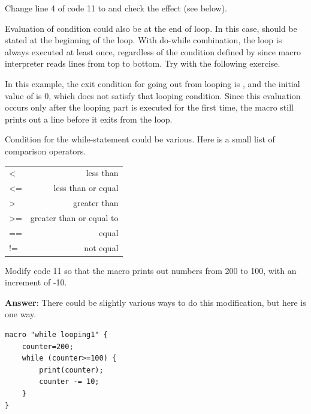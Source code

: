 \begin{indentexercise}{2}
Change line 4 of code 11 to  and check the effect (see below).
\end{indentexercise}

Evaluation of  condition could also be at the end of loop. In this case,  should be stated at the beginning of the loop. With do-while combination, the loop is always executed at least once, regardless of the condition defined by  since macro interpreter reads lines from top to bottom. Try with the following exercise.




In this example, the exit condition for going out from looping is , and the initial value of  is 0, which does not satisfy that looping condition. Since this evaluation occurs only after the looping part is executed for the first time, the macro still prints out a line before it exits from the loop.  

Condition for the while-statement could be various. Here is a small list of comparison operators.

\begin{indentCom}
 \begin{tabular*}{0.5\textwidth}{ l r }
< & less than \\
<= & less than or equal\\ 
> & greater than\\ 
>= & greater than or equal to\\
== & equal\\
!= & not equal\\
 \end{tabular*}
\end{indentCom}

\begin{indentexercise}{3}
Modify code 11 so that the macro prints out numbers from 200 to 100, with an increment of -10. 

\item \textbf{Answer}: There could be slightly various ways to do this modification, but here is one way. 
	\begin{lstlisting}
macro "while looping1" {
	counter=200;
	while (counter>=100) {
		print(counter);
		counter -= 10;
	}
}
\end{lstlisting}

\end{indentexercise}


